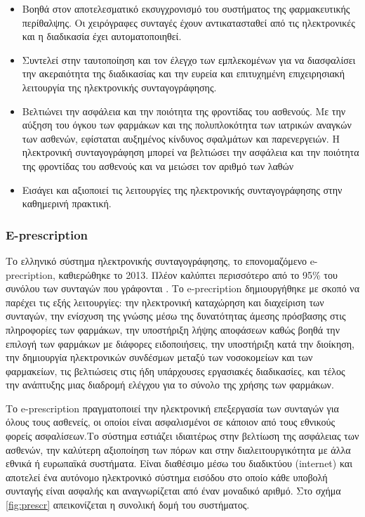 		\begin{itemize}

		\item  Βοηθά στον αποτελεσματικό εκσυγχρονισμό του συστήματος της φαρμακευτικής περίθαλψης. Οι χειρόγραφες συνταγές έχουν αντικατασταθεί από τις ηλεκτρονικές και η διαδικασία έχει αυτοματοποιηθεί.
		 
		\item Συντελεί στην ταυτοποίηση και τον έλεγχο των εμπλεκομένων για να διασφαλίσει την ακεραιότητα της διαδικασίας και την ευρεία και επιτυχημένη επιχειρησιακή λειτουργία της ηλεκτρονικής συνταγογράφησης.
		
		\item Βελτιώνει την ασφάλεια και την ποιότητα της φροντίδας του ασθενούς. Με την αύξηση του όγκου των φαρμάκων και της πολυπλοκότητα των ιατρικών αναγκών των ασθενών, εφίσταται αυξημένος κίνδυνος σφαλμάτων και παρενεργειών. Η ηλεκτρονική συνταγογράφηση μπορεί να βελτιώσει την ασφάλεια και την ποιότητα της φροντίδας του ασθενούς και να μειώσει τον αριθμό των λαθών
		
		\item Εισάγει και αξιοποιεί τις λειτουργίες της ηλεκτρονικής συνταγογράφησης στην καθημερινή πρακτική.

		\end{itemize}

	\subsubsection{E-prescription }
	
		Το ελληνικό σύστημα ηλεκτρονικής συνταγογράφησης,  το επονομαζόμενο e-precription, καθιερώθηκε το 2013. Πλέον καλύπτει περισσότερο  από το 95\% του συνόλου των συνταγών που γράφονται . Το e-precription δημιουργήθηκε με σκοπό να παρέχει τις εξής λειτουργίες: την ηλεκτρονική καταχώρηση και διαχείριση των συνταγών, την ενίσχυση της γνώσης μέσω της δυνατότητας άμεσης πρόσβασης στις πληροφορίες των φαρμάκων, την υποστήριξη λήψης αποφάσεων καθώς βοηθά την επιλογή των φαρμάκων με διάφορες ειδοποιήσεις, την υποστήριξη κατά την διοίκηση, την δημιουργία ηλεκτρονικών συνδέσμων μεταξύ των νοσοκομείων και των φαρμακείων, τις βελτιώσεις στις ήδη υπάρχουσες εργασιακές διαδικασίες, και τέλος την ανάπτυξης μιας διαδρομή ελέγχου για το σύνολο της χρήσης των φαρμάκων.  \cite{miller}
		
		Το e-prescription πραγματοποιεί την ηλεκτρονική επεξεργασία των συνταγών για όλους τους ασθενείς, οι οποίοι είναι ασφαλισμένοι σε κάποιον από τους εθνικούς φορείς ασφαλίσεων.Το σύστημα εστιάζει ιδιαιτέρως στην βελτίωση της ασφάλειας των ασθενών, την καλύτερη αξιοποίηση των πόρων και στην διαλειτουργικότητα με άλλα εθνικά ή ευρωπαϊκά συστήματα. Είναι διαθέσιμο μέσω του διαδικτύου (internet) και αποτελεί ένα αυτόνομο ηλεκτρονικό σύστημα εισόδου στο οποίο κάθε υποβολή συνταγής είναι ασφαλής και αναγνωρίζεται από έναν μοναδικό αριθμό. Στο σχήμα \ref{fig:prescr} απεικονίζεται η συνολική δομή του συστήματος. \cite{pangalos}
		
